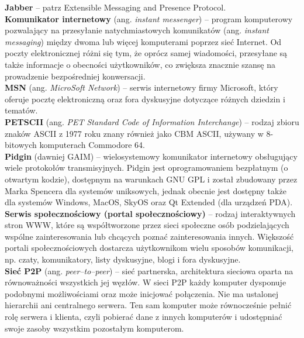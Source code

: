 \documentclass[a4paper,12pt]{article}
\begin{document}
\noindent\textbf{Jabber} -- patrz Extensible Messaging and Presence Protocol.\\

\noindent\textbf{Komunikator internetowy} (ang. \textit{instant messenger}) -- program komputerowy pozwalający na przesyłanie natychmiastowych komunikatów (ang. \textit{instant messaging}) między dwoma lub więcej komputerami poprzez sieć Internet. Od poczty elektronicznej różni się tym, że oprócz samej wiadomości, przesyłane są także informacje o obecności użytkowników, co zwiększa znacznie szansę na prowadzenie bezpośredniej konwersacji.\\

\noindent\textbf{MSN} (ang. \textit{MicroSoft Network}) -- serwis internetowy firmy Microsoft, który oferuje pocztę elektroniczną oraz fora dyskusyjne dotyczące różnych dziedzin i tematów.\\

\noindent\textbf{PETSCII} (ang. \textit{PET Standard Code of Information Interchange}) -- rodzaj zbioru znaków ASCII z 1977 roku znany również jako CBM ASCII, używany w 8-bitowych komputerach Commodore 64.\\

\noindent\textbf{Pidgin} (dawniej GAIM) -- wielosystemowy komunikator internetowy obsługujący wiele protokołów transmisyjnych. Pidgin jest oprogramowaniem bezpłatnym (o otwartym kodzie), dostępnym na warunkach GNU GPL i został zbudowany przez Marka Spencera dla systemów uniksowych, jednak obecnie jest dostępny także dla systemów Windows, MacOS, SkyOS oraz Qt Extended (dla urządzeń PDA).\\

\noindent\textbf{Serwis społecznościowy (portal społecznościowy)} -- rodzaj interaktywnych stron WWW, które są współtworzone przez sieci społeczne osób podzielających wspólne zainteresowania lub chcących poznać zainteresowania innych. Większość portali społecznościowych dostarcza użytkownikom wielu sposobów komunikacji, np. czaty, komunikatory, listy dyskusyjne, blogi i fora dyskusyjne.\\

\noindent\textbf{Sieć P2P} (ang. \textit{peer--to--peer}) -- sieć partnerska, architektura sieciowa oparta na równoważności wszystkich jej węzłów. W sieci P2P każdy komputer dysponuje podobnymi możliwościami oraz może inicjować połączenia. Nie ma ustalonej hierarchii ani centralnego serwera. Ten sam komputer może równocześnie pełnić rolę serwera i klienta, czyli pobierać dane z innych komputerów i udostępniać swoje zasoby wszystkim pozostałym komputerom.\\
\end{document}
